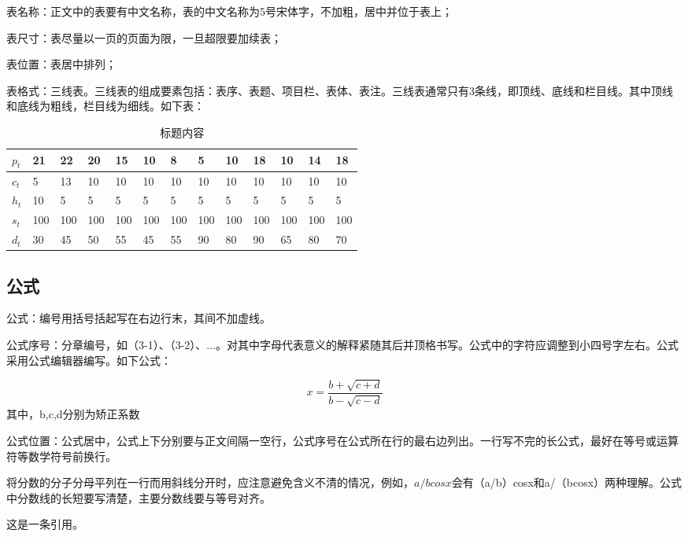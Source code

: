 \documentclass[
	StudentName     = 姓名,
	StudentID       = 学号,
	AdvisorName     = 指导教师,
	Grade           = 年级,
	Major           = 专业,
	Department      = 一个很长很长的名字,
	SubmitYear		= 2022,
	SubmitMonth		= 5,
	Title           = 论文中文题目,
	TitleEng        = {{English Title}}
]{cauc_thesis}
\begin{document}
	表名称：正文中的表要有中文名称，表的中文名称为5号宋体字，不加粗，居中并位于表上；
	
	表尺寸：表尽量以一页的页面为限，一旦超限要加续表；
	
	表位置：表居中排列；
	
	表格式：三线表。三线表的组成要素包括：表序、表题、项目栏、表体、表注。三线表通常只有3条线，即顶线、底线和栏目线。其中顶线和底线为粗线，栏目线为细线。如下表：
	
	\begin{table}[!ht]
		\caption{标题内容}\label{tab:lable}
		\begin{tabular*}{\hsize}{@{}@{\extracolsep{\fill}}lllllllllllll@{}}
			\toprule
			$p_{t}$  &21  &22  &20  &15  &10  &8   &5   &10  &18  &10  &14  &18\\
			\midrule
			$c_{t}$  &5   &13  &10  &10  &10  &10  &10  &10  &10  &10  &10  &10\\
			$h_{t}$  &10  &5   &5   &5   &5   &5   &5   &5   &5   &5   &5   &5 \\
			$s_{t}$  &100 &100 &100 &100 &100 &100 &100 &100 &100 &100 &100 &100\\
			$d_{t}$  &30  &45  &50  &55  &45  &55  &90  &80  &90  &65  &80  &70 \\
			\bottomrule
		\end{tabular*}
	\end{table}
	
	\subsection{公式}
	
	公式：编号用括号括起写在右边行末，其间不加虚线。
	
	公式序号：分章编号，如（3-1）、（3-2）、...。对其中字母代表意义的解释紧随其后并顶格书写。公式中的字符应调整到小四号字左右。公式采用公式编辑器编写。如下公式：
	
	\begin{equation}
		x=\frac{b+\sqrt{c+d}}{b-\sqrt{c-d}}
	\end{equation}
	其中，b,c,d分别为矫正系数
	
	公式位置：公式居中，公式上下分别要与正文间隔一空行，公式序号在公式所在行的最右边列出。一行写不完的长公式，最好在等号或运算符等数学符号前换行。
	
	将分数的分子分母平列在一行而用斜线分开时，应注意避免含义不清的情况，例如，$a\slash bcosx$会有（a/b）cosx和a/（bcosx）两种理解。公式中分数线的长短要写清楚，主要分数线要与等号对齐。

	这是一条引用\cite{alahiSocialLSTMHuman2016}。
	
\end{document}

